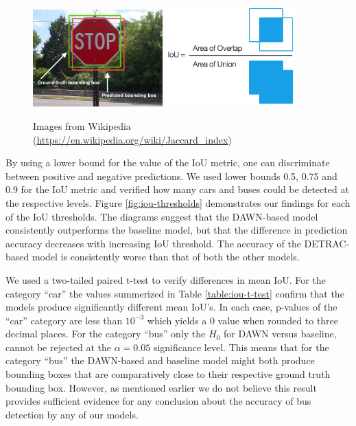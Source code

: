 \documentclass[]{article}
\begin{document}
	\begin{figure}[h]
		\centering
		\includegraphics[width=5cm]{Intersection_over_Union_-_object_detection_bounding_boxes.jpg}
		\includegraphics[width=5cm]{Intersection_over_Union_-_visual_equation.png}
		\caption{Images from Wikipedia \footnotesize{(\url{https://en.wikipedia.org/wiki/Jaccard_index})}}
		\label{fig:iou}
	\end{figure}
	
	By using a lower bound for the value of the IoU metric, one can discriminate between positive and negative predictions. We used lower bounds 0.5, 0.75 and 0.9 for the IoU metric and verified how many cars and buses could be detected at the respective levels. Figure \ref{fig:iou-thresholds} demonstrates our findings for each of the IoU thresholds. The diagrams suggest that the DAWN-based model consistently outperforms the baseline model, but that the difference in prediction accuracy decreases with increasing IoU threshold. The accuracy of the DETRAC-based model is consistently worse than that of both the other models. 
	
	We used a two-tailed paired t-test to verify differences in mean IoU. For the category ``car'' the values summerized in Table \ref{table:iou-t-test} confirm that the models produce significantly different mean IoU's. In each case, p-values of the ``car'' category are less than $10^{-3}$ which yields a $0$ value when rounded to three decimal places. For the category ``bus'' only the $H_0$ for DAWN versus baseline, cannot be rejected at the $\alpha = 0.05$ significance level. This means that for the category ``bus'' the DAWN-based and baseline model might both produce bounding boxes that are comparatively close to their respective ground truth bounding box. However, as mentioned earlier we do not believe this result provides sufficient evidence for any conclusion about the accuracy of bus detection by any of our models.
	
\end{document}
